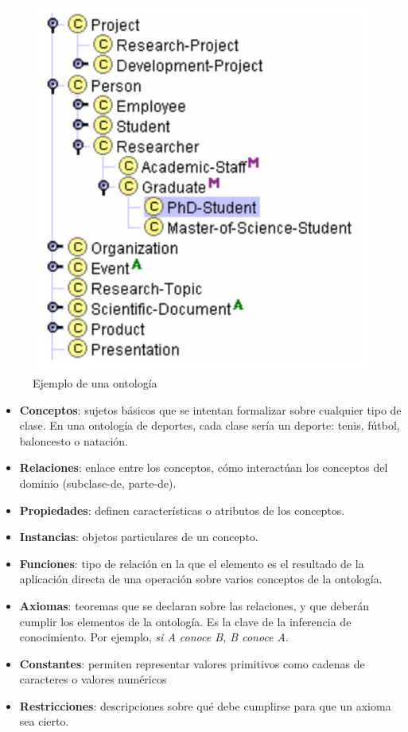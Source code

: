 \begin{figure}[H]
	\centering
	\includegraphics[width=0.55\linewidth]{imagenes/capitulo3/ejemplo-owl}
	\caption{Ejemplo de una ontología \cite{apuntes-clase-jose}}
	\label{fig:ejemplo-owl}
\end{figure}


\begin{itemize}
	\item \textbf{Conceptos}: sujetos básicos que se intentan formalizar sobre cualquier tipo de clase. En una ontología de deportes, cada clase sería un deporte: tenis, fútbol, baloncesto o natación.
	
	\item  \textbf{Relaciones}: enlace entre los conceptos, cómo interactúan los conceptos del dominio (subclase-de, parte-de).
	
	\item \textbf{Propiedades}: definen características o atributos de los conceptos.
	
	\item \textbf{Instancias}: objetos particulares de un concepto.
		
	\item \textbf{Funciones}: tipo de relación en la que el elemento es el resultado de la aplicación directa de una operación sobre varios conceptos de la ontología.
		
	\item \textbf{Axiomas}: teoremas que se declaran sobre las relaciones, y que deberán cumplir los elementos de la ontología. Es la clave de la inferencia de conocimiento. Por ejemplo, \textit{si A conoce B, B conoce A}.
	
	\item \textbf{Constantes}: permiten representar valores primitivos como cadenas de caracteres o valores numéricos
	
	\item \textbf{Restricciones}: descripciones sobre qué debe cumplirse para que un axioma sea cierto.
	
\end{itemize}

